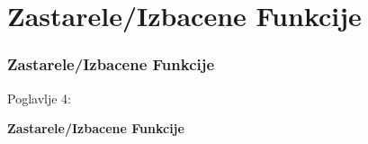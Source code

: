 %

\section{Zastarele/Izbacene Funkcije}
\begin{frame}[fragile]
	\frametitle{Zastarele/Izbacene Funkcije}

	\begin{center}\huge{Poglavlje 4:}\end{center}
	\begin{center}\huge{\color{typo3darkgrey}\textbf{Zastarele/Izbacene Funkcije}}\end{center}

\end{frame}


